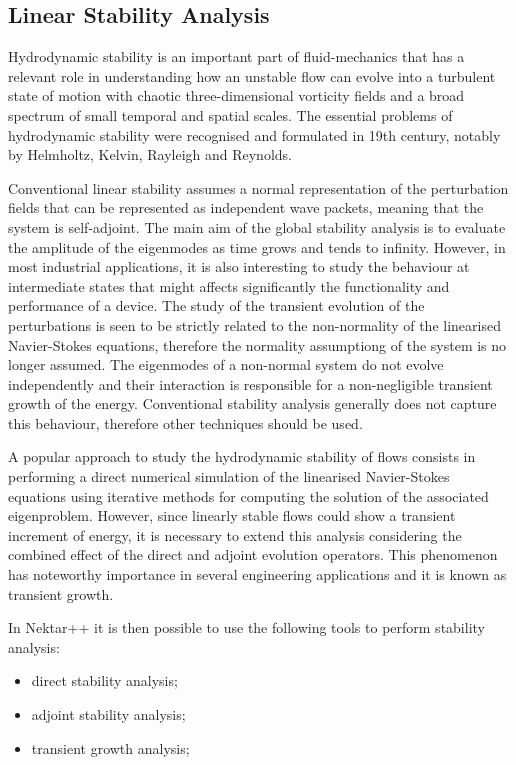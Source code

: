 \subsection{Linear Stability Analysis}

Hydrodynamic stability is an important part of fluid-mechanics that has a relevant role in understanding how an unstable flow can evolve into a turbulent state of motion with chaotic three-dimensional vorticity fields and a broad spectrum of small temporal and spatial scales. The essential problems of hydrodynamic stability were recognised and formulated in 19th century, notably by Helmholtz, Kelvin, Rayleigh and Reynolds.

Conventional linear stability assumes a normal representation of the perturbation fields that can be represented as independent wave packets, meaning that the system is self-adjoint. The main aim of the global stability analysis is to evaluate the amplitude of the eigenmodes as time grows and tends to infinity. However, in most industrial applications, it is also interesting to study the behaviour at intermediate states that might affects significantly the functionality and performance of a device. The study of the transient evolution of the perturbations is seen to be strictly related to the non-normality of the linearised Navier-Stokes equations, therefore the normality assumptiong of the system is no longer assumed. The eigenmodes of a non-normal system do not evolve independently and their interaction is responsible for a non-negligible transient growth of the energy. Conventional stability analysis generally does not capture this behaviour, therefore other techniques should be used.

A popular approach to study the hydrodynamic stability of flows consists in performing a direct numerical simulation of the linearised Navier-Stokes equations using iterative methods for computing the solution of the associated eigenproblem. However, since linearly stable flows could show a transient increment of energy, it is necessary to extend this analysis considering the combined effect of the direct and adjoint evolution operators. This phenomenon has noteworthy importance in several engineering applications and it is known as transient growth.

In Nektar++ it is then possible to use the following tools to perform stability analysis:

\begin{itemize}
\item direct stability analysis;
\item adjoint stability analysis;
\item  transient growth analysis;
\end{itemize}

